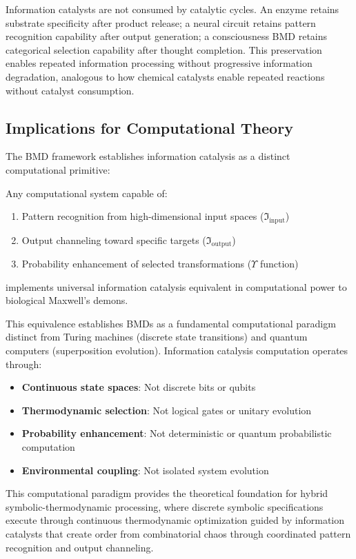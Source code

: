 Information catalysts are not consumed by catalytic cycles. An enzyme retains substrate specificity after product release; a neural circuit retains pattern recognition capability after output generation; a consciousness BMD retains categorical selection capability after thought completion. This preservation enables repeated information processing without progressive information degradation, analogous to how chemical catalysts enable repeated reactions without catalyst consumption.

\subsection{Implications for Computational Theory}

The BMD framework establishes information catalysis as a distinct computational primitive:

\begin{theorem}
Any computational system capable of:
\begin{enumerate}
\item Pattern recognition from high-dimensional input spaces (\(\Im_{\text{input}}\))
\item Output channeling toward specific targets (\(\Im_{\text{output}}\))
\item Probability enhancement of selected transformations (\(\Upsilon\) function)
\end{enumerate}
implements universal information catalysis equivalent in computational power to biological Maxwell's demons.
\end{theorem}

This equivalence establishes BMDs as a fundamental computational paradigm distinct from Turing machines (discrete state transitions) and quantum computers (superposition evolution). Information catalysis computation operates through:

\begin{itemize}
\item \textbf{Continuous state spaces}: Not discrete bits or qubits
\item \textbf{Thermodynamic selection}: Not logical gates or unitary evolution
\item \textbf{Probability enhancement}: Not deterministic or quantum probabilistic computation
\item \textbf{Environmental coupling}: Not isolated system evolution
\end{itemize}

This computational paradigm provides the theoretical foundation for hybrid symbolic-thermodynamic processing, where discrete symbolic specifications execute through continuous thermodynamic optimization guided by information catalysts that create order from combinatorial chaos through coordinated pattern recognition and output channeling.

